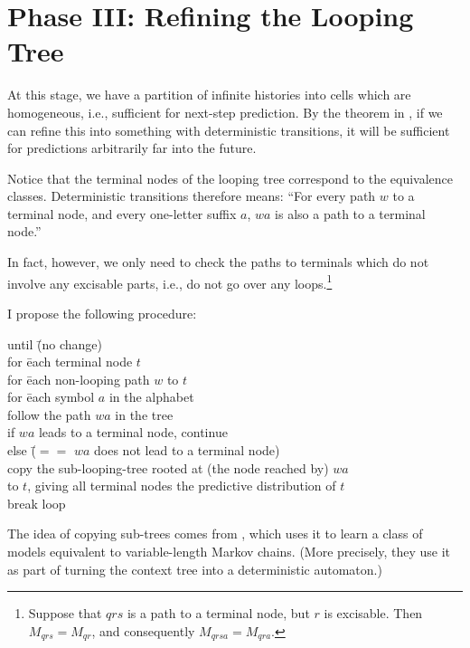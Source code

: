 \documentclass[../new-procedure.tex]{subfiles}
\begin{document}
\section{Phase III: Refining the Looping Tree}

At this stage, we have a partition of infinite histories into cells which are
homogeneous, i.e., sufficient for next-step prediction.  By the theorem in
\cite{CMPPSS}, if we can refine this into something with deterministic
transitions, it will be sufficient for predictions arbitrarily far into the
future.

Notice that the terminal nodes of the looping tree correspond to the
equivalence classes.  Deterministic transitions therefore means: ``For every
path $w$ to a terminal node, and every one-letter suffix $a$, $wa$ is also a
path to a terminal node.''

In fact, however, we only need to check the paths to terminals which do not
involve any excisable parts, i.e., do not go over any loops.\footnote{Suppose
  that $qrs$ is a path to a terminal node, but $r$ is excisable.  Then
  $M_{qrs}= M_{qr}$, and consequently $M_{qrsa} = M_{qra}$.}

I propose the following procedure:

\begin{tabbing}
  until \= (no change)\\
  \> for \= each terminal node $t$\\
  \> \> for \= each non-looping path $w$ to $t$\\
  \> \> \> for \= each symbol $a$ in the alphabet\\
  \> \> \> \> follow the path $wa$ in the tree\\
  \> \> \> \> if $wa$ leads to a terminal node, continue\\
  \> \> \> \> else \= ($==$ $wa$ does not lead to a terminal node)\\
  \> \> \> \> \> copy the sub-looping-tree rooted at (the node reached by) $wa$\\
\> \> \> \> \> to $t$, giving all terminal nodes the predictive distribution of $t$\\
  \> \> \> \> \> break loop
\end{tabbing}

The idea of copying sub-trees comes from \cite{Ron-Singer-Tishby-amnesia},
which uses it to learn a class of models equivalent to variable-length Markov
chains.  (More precisely, they use it as part of turning the context tree into
a deterministic automaton.)
\end{document}
